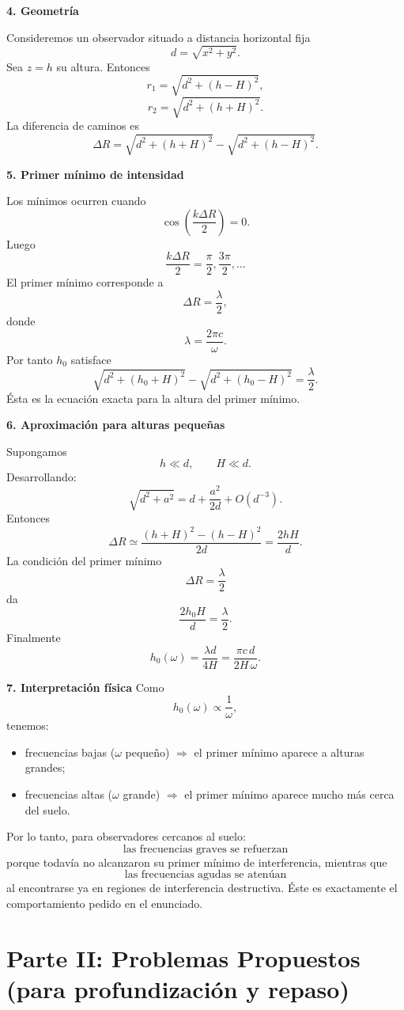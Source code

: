 \documentclass[11pt,spanish]{article}
\begin{document}
{\bf 4. Geometría}

Consideremos un observador situado a distancia horizontal fija
$$
d=\sqrt{x^2+y^2}.
$$
Sea $z=h$ su altura.
Entonces
$$
r_1=\sqrt{d^2+(h-H)^2},
$$
$$
r_2=\sqrt{d^2+(h+H)^2}.
$$
La diferencia de caminos es
$$
\boxed{
\Delta R
=
\sqrt{d^2+(h+H)^2}
-
\sqrt{d^2+(h-H)^2}.
}
$$

{\bf 5. Primer mínimo de intensidad}

Los mínimos ocurren cuando
$$
\cos\left(\frac{k\Delta R}{2}\right)=0.
$$
Luego
$$
\frac{k\Delta R}{2}
=
\frac{\pi}{2},
\frac{3\pi}{2},
\ldots
$$
El primer mínimo corresponde a
$$
\Delta R=\frac{\lambda}{2},
$$
donde
$$
\lambda=\frac{2\pi c}{\omega}.
$$
Por tanto $h_0$ satisface
$$
\boxed{
\sqrt{d^2+(h_0+H)^2}
-
\sqrt{d^2+(h_0-H)^2}
=
\frac{\lambda}{2}.
}
$$
Ésta es la ecuación exacta para la altura del primer mínimo.

{\bf 6. Aproximación para alturas pequeñas}

Supongamos
$$
h\ll d,
\qquad
H\ll d.
$$
Desarrollando:
$$
\sqrt{d^2+a^2}
=
d+\frac{a^2}{2d}+O(d^{-3}).
$$
Entonces
$$
\Delta R
\simeq
\frac{(h+H)^2-(h-H)^2}{2d}
=
\frac{2hH}{d}.
$$
La condición del primer mínimo
$$
\Delta R=\frac{\lambda}{2}
$$
da
$$
\frac{2h_0H}{d}
=
\frac{\lambda}{2}.
$$
Finalmente
$$
\boxed{
h_0(\omega)
=
\frac{\lambda d}{4H}
=
\frac{\pi c\, d}{2H\,\omega}.
}
$$

{\bf 7. Interpretación física}
Como
$$
h_0(\omega)\propto\frac1\omega,
$$
tenemos:
\begin{itemize}
\item frecuencias bajas ($\omega$ pequeño) $\Rightarrow$ el primer mínimo aparece a alturas grandes;
\item frecuencias altas ($\omega$ grande) $\Rightarrow$ el primer mínimo aparece mucho más cerca del suelo.
\end{itemize}
Por lo tanto, para observadores cercanos al suelo:
$$
\boxed{
\text{las frecuencias graves se refuerzan}
}
$$
porque todavía no alcanzaron su primer mínimo de interferencia, mientras que
$$
\boxed{
\text{las frecuencias agudas se atenúan}
}
$$
al encontrarse ya en regiones de interferencia destructiva.
Éste es exactamente el comportamiento pedido en el enunciado. 




\section*{Parte II: Problemas Propuestos (para profundización y repaso)}
\end{document}

